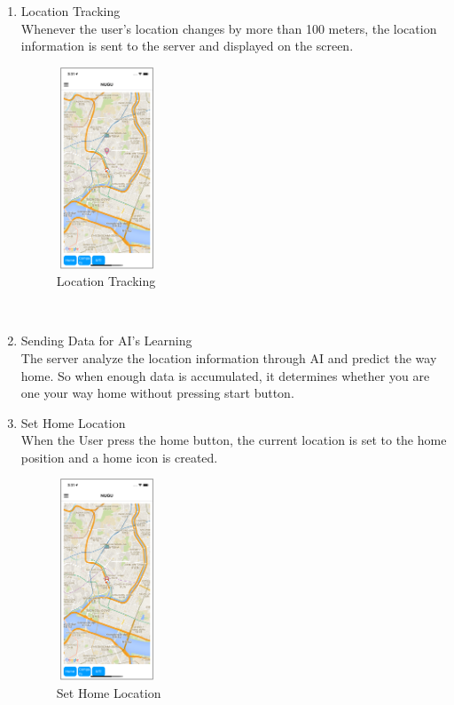 \documentclass[conference]{IEEEtran}
\begin{document}
\begin{enumerate}
    
    \item Location Tracking\\
    Whenever the user’s location changes by more than 100 meters, the location information is sent to the server and displayed on the screen.\\
    \begin{figure}[htbp]
        \centering
        \includegraphics[width=3cm, height=6cm]{images/figure14.png}
        \caption{Location Tracking}
    \end{figure}
     \\
    \item Sending Data for AI’s Learning\\
    The server analyze the location information through AI and predict the way home. So when enough data is accumulated, it determines whether you are one your way home without pressing start button.\\
    \item Set Home Location\\
    When the User press the home button, the current location is set to the home position and a home icon is created.
    \begin{figure}[htbp]
        \centering
        \includegraphics[width=3cm, height=6cm]{images/figure15.png}
        \caption{Set Home Location}
    \end{figure}
    

\end{enumerate}
\end{document}

